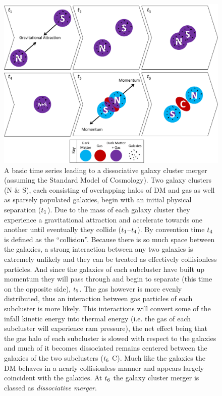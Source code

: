 \begin{figure}
\centering
\includegraphics[width=6in]{Chapter1/MergerTimeSeries.png}
\caption{A basic time series leading to a dissociative galaxy cluster merger (assuming the Standard Model of Cosmology).
Two galaxy clusters (N \& S), each consisting of overlapping halos of DM and gas as well as sparsely populated galaxies, begin with an initial physical separation ($t_{\rm 1}$).
Due to the mass of each galaxy cluster they experience a gravitational attraction and accelerate towards one another until eventually they collide ($t_{\rm 1}$--$t_{\rm 4}$).
By convention time $t_{\rm 4}$ is defined as the ``collision''.
Because there is so much space between the galaxies, a strong interaction between any two galaxies is extremely unlikely and they can be treated as effectively collisionless particles.
And since the galaxies of each subcluster have built up momentum they will pass through and begin to separate (this time on the opposite side), $t_{\rm 5}$.
The gas however is more evenly distributed, thus an interaction between gas particles of each subcluster is more likely.
This interactions will convert some of the infall kinetic energy into thermal energy (i.e. the gas of each subcluster will experience ram pressure), the net effect being that the gas halo of each subcluster is slowed with respect to the galaxies and much of it becomes dissociated remains centered between the galaxies of the two subclusters ($t_{\rm 6}$ C).
Much like the galaxies the DM behaves in a nearly collisionless manner and appears largely coincident with the galaxies.
At $t_{\rm 6}$ the galaxy cluster merger is classed as \emph{dissociative merger}.
\label{fig:MergerTimeSeries}}
\end{figure}  

